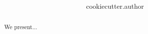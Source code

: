 \documentclass[12pt]{article}
\title{\bfseries \sffamily {{cookiecutter.title}} }
\author{ {{cookiecutter.author}} }
\begin{document}
\maketitle

\begin{abstract}
We present...
\end{abstract}





\end{document}

